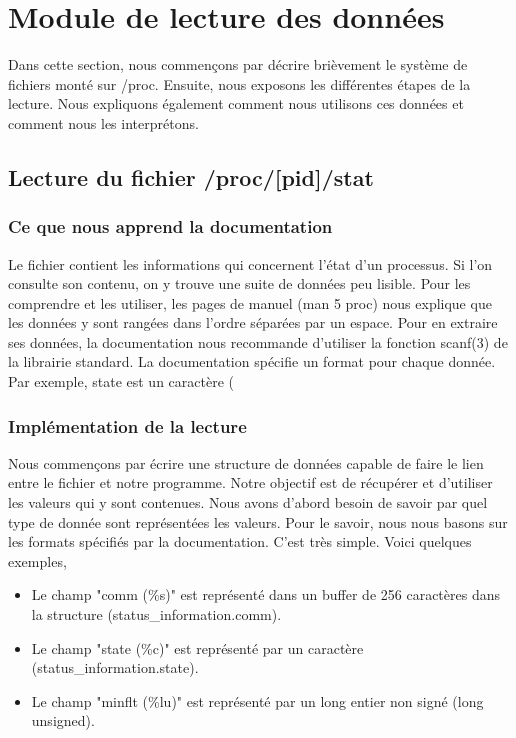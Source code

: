 \section{Module de lecture des données}
Dans cette section, nous commençons par décrire brièvement le système de fichiers monté sur /proc. Ensuite, nous exposons les différentes étapes de la lecture. Nous expliquons également comment nous utilisons ces données et comment nous les interprétons.

\subsection{Lecture du fichier /proc/[pid]/stat}
\subsubsection{Ce que nous apprend la documentation}
Le fichier contient les informations qui concernent l’état d'un processus. Si l'on consulte son contenu, on y trouve une suite de données peu lisible.
Pour les comprendre et les utiliser, les pages de manuel (man 5 proc) nous explique que les données y sont rangées dans l'ordre séparées par un espace. Pour en extraire ses données, la documentation nous recommande d'utiliser la fonction scanf(3) de la librairie standard. La documentation spécifie un format pour chaque donnée. Par exemple, state est un caractère (%

\subsubsection{Implémentation de la lecture}
Nous commençons par écrire une structure de données capable de faire le lien entre le fichier et notre programme. Notre objectif est de récupérer et d’utiliser les valeurs qui y sont contenues.
Nous avons d’abord besoin de savoir par quel type de donnée sont représentées les valeurs. Pour le savoir, nous nous basons sur les formats spécifiés par la documentation. C’est très simple. Voici quelques exemples,

\begin{itemize}
\item Le champ "comm (\%s)" est représenté dans un buffer de 256 caractères dans la structure (status\_information.comm).
\item Le champ "state (\%c)" est représenté par un caractère (status\_information.state).
\item Le champ "minflt (\%lu)" est représenté par un long entier non signé (long unsigned).
\end{itemize}

